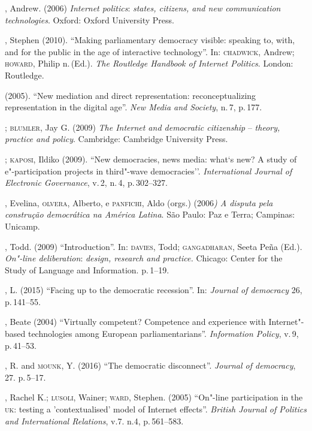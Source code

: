 \begin{bibliohedra}
, Andrew. (2006) \textit{Internet politics}: \textit{states,
citizens, and new communication technologies}. Oxford: Oxford University
Press.

, Stephen (2010). ``Making parliamentary democracy visible:
speaking to, with, and for the public in the age of interactive
technology''. In: \textsc{chadwick}, Andrew; \textsc{howard}, Philip n.\,(Ed.). \textit{The
Routledge Handbook of Internet Politics}. London: Routledge.

\titidem\mbox{} (2005). ``New mediation and direct representation:
reconceptualizing representation in the digital age''. \textit{New Media
and Society}, n.\,7, p.\,177.

\titidem; \textsc{blumler}, Jay G. (2009) \textit{The Internet and
democratic citizenship} -- \textit{theory, practice and policy}.
Cambridge: Cambridge University Press.

\titidem; \textsc{kaposi}, Ildiko (2009). ``New democracies, news media:
what`s new? A study of e"-participation projects in third"-wave
democracies''. \textit{International Journal of Electronic Governance}, v.\,2, n.\,4, p.\,302--327.

, Evelina, \textsc{olvera}, Alberto, e \textsc{panfichi}, Aldo (orgs.) (2006\textit{)
A disputa pela construção democrática na América Latina}. São Paulo: Paz
e Terra; Campinas: Unicamp.

, Todd. (2009) ``Introduction''. In: \textsc{davies}, Todd; \textsc{gangadharan},
Seeta Peña (Ed.). \textit{On"-line deliberation}: \textit{design, research
and practice.} Chicago: Center for the Study of Language and
Information. p.\,1--19.

, L. (2015) ``Facing up to the democratic recession''. In:
\textit{Journal of democracy} 26, p.\,141--55.

, Beate (2004) ``Virtually competent? Competence and experience
with Internet"-based technologies among European parliamentarians''.
\textit{Information Policy}, v.\,9, p.\,41--53.

, R. and \textsc{mounk}, Y. (2016) ``The democratic disconnect''.
\textit{Journal of democracy}, 27. p.\,5--17.

, Rachel K.; \textsc{lusoli}, Wainer; \textsc{ward}, Stephen. (2005) ``On"-line
participation in the \textsc{uk}: testing a 'contextualised' model of Internet
effects''. \textit{British Journal of Politics and International
Relations}, v.7. n.4, p.\,561--583.


\end{bibliohedra}

